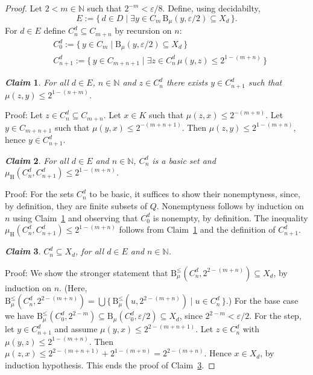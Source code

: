 \documentclass[microtype]{jloganal}
\newtheorem{claim}{\it Claim}
\theoremstyle{plain}
\theoremstyle{definition}
\newcommand{\NN}{\mathbb{N}}
\newcommand{\ball}[3]{\mathrm{B}_{#1}(#2,#3)}
\newcommand{\cball}[3]{\mathrm{B}^\le_{#1}(#2,#3)}
\newcommand{\hdm}{\mu_{\mathrm H}}
\begin{document}
\begin{proof}
Let $2 < m\in\NN$ such that $2^{-m} < \varepsilon/{8}$. 
Define, using decidabilty,
\[E := \{\, d\in D \mid 
 \exists y\in C_m \,\ball{\mu}{y}{\varepsilon/2}\subseteq X_d\,\}.\]
For $d\in E$ define $C^d_n\subseteq C_{m+n}$ by recursion on $n$:
\begin{align*}
&C^d_0 := \{\,y\in C_m\mid\ball{\mu}{y}{\varepsilon/2}\subseteq X_d\,\}\\
&C^d_{n+1} := \{\,y\in C_{m+n+1}\mid\exists z\in C^d_n\,\mu(y,z)\le 2^{1-(m+n)}\,\}
\end{align*}
\begin{claim}
\label{claim-split-cdn}
For all $d\in E$, $n\in\NN$ and  $z\in C^d_n$ there exists $y\in C^d_{n+1}$
such that $\mu(z,y)\le 2^{1-(n+m)}$.
\end{claim}
Proof: Let $z\in C^d_n\subseteq C_{m+n}$.
Let $x\in K$ such that $\mu(z,x)\le 2^{-(m+n)}$.
Let $y\in C_{m+n+1}$ such that $\mu(y,x)\le 2^{-(m+n+1)}$.
Then $\mu(z,y) \le 2^{1-(m+n)}$, hence $y\in C^d_{n+1}$.

\begin{claim}
\label{claim-split-cdn-cauchy}
For all $d\in E$ and $n\in\NN$, $C^d_n$ is a basic set and 
$\hdm(C^d_n,C^d_{n+1}) \le 2^{1-(m+n)}$.
\end{claim}
Proof: For the sets $C^d_n$ to be basic, it suffices to show their nonemptyness, since,
by definition, they are finite subsets of $Q$. Nonemptyness follows by induction
on $n$ using Claim~\ref{claim-split-cdn} and observing that $C^d_0$ is nonempty,
by definition.
The inequality $\hdm(C^d_n,C^d_{n+1}) \le 2^{1-(m+n)}$ follows from 
Claim~\ref{claim-split-cdn} and the definition of $C^d_{n+1}$.

\begin{claim}
\label{claim-split-cdn-subxd}
$C^d_n \subseteq X_d$, for all $d\in E$ and $n\in\NN$.
\end{claim}
Proof:
We show the stronger statement that 
$\cball{\mu}{C^d_n}{2^{2-(m+n)}}\subseteq X_d$, by induction on $n$. (Here, $\cball{\mu}{C^d_n}{2^{2-(m+n)}} = \bigcup\{\, \cball{\mu}{u}{2^{2-(m+n)}} \mid u \in C^d_n \,\}$.)
For the base case we have  
$\cball{\mu}{C^d_0}{2^{2-m}}\subseteq 
\ball{\mu}{C^d_0}{\varepsilon/2}\subseteq X_d$,
since $2^{2-m} < \varepsilon/2$.
For the step, let $y \in C^d_{n+1}$ and assume $\mu(y,x)\le 2^{2-(m+n+1)}$.
Let $z\in C^d_n$ with $\mu(y,z)\le 2^{1-(m+n)}$. Then 
$\mu(z,x) \le 2^{2-(m+n+1)}+2^{1-(m+n)} = 2^{2-(m+n)}$. Hence $x\in X_d$,
by induction hypothesis.
This ends the proof of Claim~\ref{claim-split-cdn-subxd}.


\end{proof}
\end{document}
